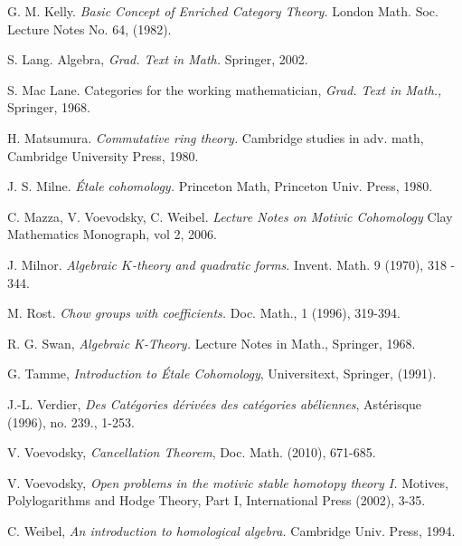 \begin{thebibliography}{10}
G. M. Kelly.
\emph{Basic Concept of Enriched Category Theory.}
London Math. Soc. Lecture Notes No. 64, (1982).

S. Lang.
Algebra, {\em Grad. Text in Math.}
Springer, 2002.

S. Mac Lane.
Categories for the working mathematician, 
{\em Grad. Text in Math.,} Springer, 1968.

H. Matsumura.
\emph{Commutative ring theory.}
Cambridge studies in adv. math,
Cambridge University Press, 1980.

J. S. Milne.
\emph{\'Etale cohomology.} 
Princeton Math,
Princeton Univ. Press, 1980.

C. Mazza, V. Voevodsky, C. Weibel.
\emph{Lecture Notes on Motivic Cohomology}
Clay Mathematics Monograph, vol 2, 2006.

J. Milnor.
\emph{Algebraic $K$-theory and quadratic forms.}
Invent. Math. 9 (1970), 318 - 344.

M. Rost.
\emph{Chow groups with coefficients.}
Doc. Math., 1 (1996), 319-394.

R. G. Swan,
\emph{Algebraic K-Theory.}
Lecture Notes in Math.,
Springer, 1968.

G. Tamme,
\emph{Introduction to \'Etale Cohomology},
Universitext,
Springer, (1991).

J.-L. Verdier, \emph{Des Cat\'egories d\'eriv\'ees des cat\'egories
ab\'eliennes},
Ast\'erisque (1996), no. 239., 1-253.

V. Voevodsky,
\emph{Cancellation Theorem},
Doc. Math. (2010), 671-685.

V. Voevodsky,
{\em Open problems in the motivic stable homotopy theory I.}
Motives, Polylogarithms and Hodge Theory, Part I,
International Press (2002), 3-35.

C. Weibel,
\emph{An introduction to homological algebra.}
Cambridge Univ. Press, 1994.
\end{thebibliography}
